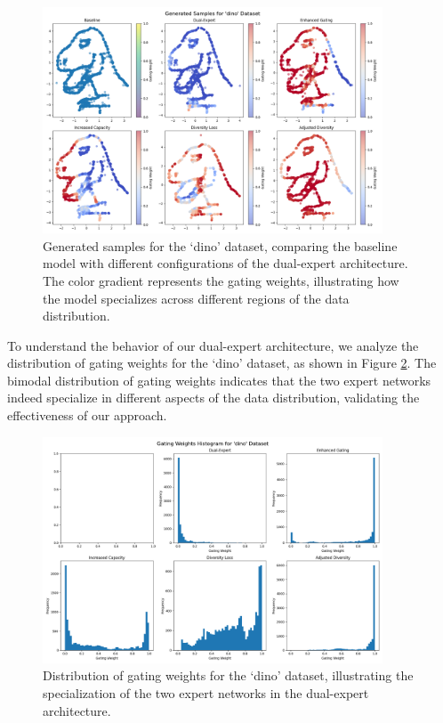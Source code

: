 \documentclass{article} %
\begin{document}
\begin{figure}[t]
    \centering
    \includegraphics[width=0.9\textwidth]{dino_generated_samples.png}
    \caption{Generated samples for the `dino' dataset, comparing the baseline model with different configurations of the dual-expert architecture. The color gradient represents the gating weights, illustrating how the model specializes across different regions of the data distribution.}
    \label{fig:dino_generated_samples}
\end{figure}

To understand the behavior of our dual-expert architecture, we analyze the distribution of gating weights for the `dino' dataset, as shown in Figure \ref{fig:dino_gating_weights}. The bimodal distribution of gating weights indicates that the two expert networks indeed specialize in different aspects of the data distribution, validating the effectiveness of our approach.

\begin{figure}[t]
    \centering
    \includegraphics[width=0.9\textwidth]{dino_gating_weights_histogram.png}
    \caption{Distribution of gating weights for the `dino' dataset, illustrating the specialization of the two expert networks in the dual-expert architecture.}
    \label{fig:dino_gating_weights}
\end{figure}
\end{document}
